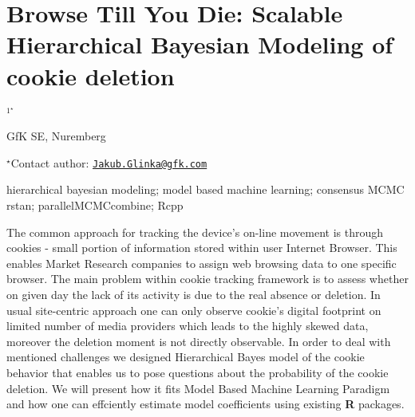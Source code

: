 \documentclass[\main/boa.tex]{subfiles}
\begin{document}
\section{Browse Till You Die: Scalable Hierarchical Bayesian Modeling of cookie
deletion}

\begin{center}
  {\bf {}$^{1^\star}$}
\end{center}

\vskip 0.3cm

\begin{affiliations}
\begin{enumerate}
\begin{minipage}{0.915\textwidth}
\centering
\item GfK SE, Nuremberg \\[-2pt]
\end{minipage}
\end{enumerate}
$^\star$Contact author: \href{mailto:Jakub.Glinka@gfk.com}{\nolinkurl{Jakub.Glinka@gfk.com}}\\
\end{affiliations}

\vskip 0.5cm

\begin{minipage}{0.915\textwidth}
\keywords hierarchical bayesian modeling; model based machine learning; consensus
MCMC
\packages rstan; parallelMCMCcombine; Rcpp
\end{minipage}

\vskip 0.8cm

The common approach for tracking the device's on-line movement is
through cookies - small portion of information stored within user
Internet Browser. This enables Market Research companies to assign web
browsing data to one specific browser. The main problem within cookie
tracking framework is to assess whether on given day the lack of its
activity is due to the real absence or deletion. In usual site-centric
approach one can only observe cookie's digital footprint on limited
number of media providers which leads to the highly skewed data,
moreover the deletion moment is not directly observable. In order to
deal with mentioned challenges we designed Hierarchical Bayes model of
the cookie behavior that enables us to pose questions about the
probability of the cookie deletion. We will present how it fits Model
Based Machine Learning Paradigm and how one can effciently estimate
model coefficients using existing \textbf{R} packages.
\end{document}
